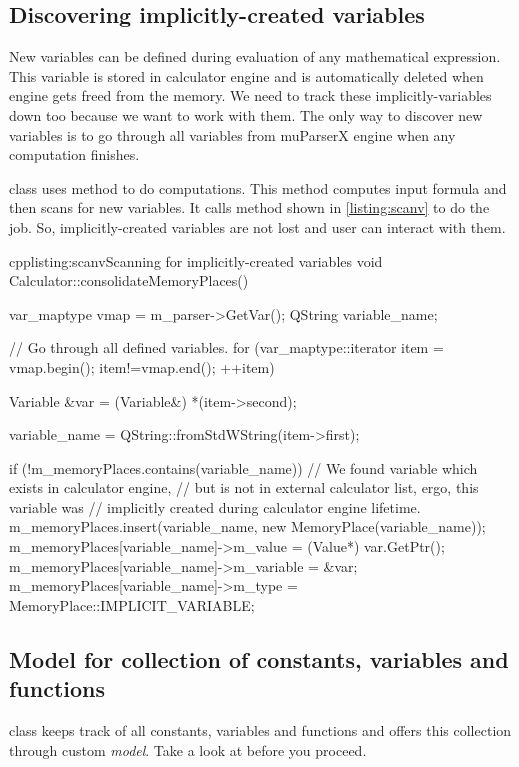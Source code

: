 \subsection{Discovering implicitly-created variables}
New variables can be defined during evaluation of any mathematical expression. This variable is stored in calculator engine and is automatically deleted when engine gets freed from the memory. We need to track these implicitly-variables down too because we want to work with them. The only way to discover new variables is to go through all variables from muParserX engine when any computation finishes.

 class uses method to do computations. This method computes input formula and then scans for new variables. It calls method shown in \autoref{listing:scanv} to do the job. So, implicitly-created variables are not lost and user can interact with them.

\begin{fdoccode}{cpp}{listing:scanv}{Scanning for implicitly-created variables}
void Calculator::consolidateMemoryPlaces() {
  var_maptype vmap = m_parser->GetVar();
  QString variable_name;

  // Go through all defined variables.
  for (var_maptype::iterator item = vmap.begin(); item!=vmap.end(); ++item) {
    Variable &var = (Variable&) *(item->second);

    variable_name = QString::fromStdWString(item->first);

    if (!m_memoryPlaces.contains(variable_name)) {
      // We found variable which exists in calculator engine,
      // but is not in external calculator list, ergo, this variable was
      // implicitly created during calculator engine lifetime.
      m_memoryPlaces.insert(variable_name, new MemoryPlace(variable_name));
      m_memoryPlaces[variable_name]->m_value = (Value*) var.GetPtr();
      m_memoryPlaces[variable_name]->m_variable = &var;
      m_memoryPlaces[variable_name]->m_type = MemoryPlace::IMPLICIT_VARIABLE;
    }
  }
}
\end{fdoccode}

\subsection{Model for collection of constants, variables and functions}
 class keeps track of all constants, variables and functions and offers this collection through custom \textit{model}. Take a look at \citep[keyword Model/View Programming]{various:qtdoc} before you proceed.

